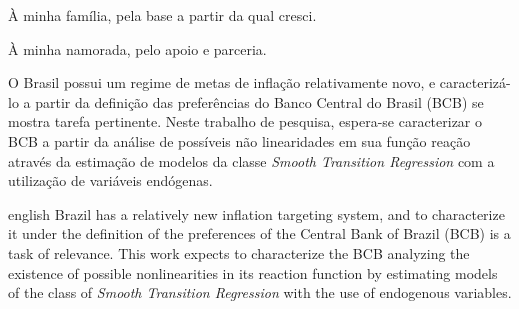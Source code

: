 \documentclass[
	article,			%
	11pt,				%
	oneside,			%
	a4paper,			%
	english,			%
	brazil,				%
	]{abntex2}
\begin{document}
\pagebreak
\begin{agradecimentos}
À minha família, pela base a partir da qual cresci. 

À minha namorada, pelo apoio e parceria.

\end{agradecimentos}


\pagebreak
\setlength{\absparsep}{18pt} %
\begin{resumo}
 O Brasil possui um regime de metas de inflação relativamente novo, e caracterizá-lo a partir da definição das preferências do Banco Central do Brasil (BCB) se mostra tarefa pertinente. Neste trabalho de pesquisa, espera-se caracterizar o BCB a partir da análise de possíveis não linearidades em sua função reação através da estimação de modelos da classe \textit{Smooth Transition Regression} com a utilização de variáveis endógenas.

\end{resumo}

\pagebreak
\begin{resumo}[Abstract]
 \begin{otherlanguage*}{english}
   Brazil has a relatively new inflation targeting system, and to characterize it under the definition of the preferences of the Central Bank of Brazil (BCB) is a task of relevance. This work expects to characterize the BCB analyzing the existence of possible nonlinearities in its reaction function by estimating models of the class of \textit{Smooth Transition Regression} with the use of endogenous variables.

   \vspace{\onelineskip}
 
   \noindent 
 \end{otherlanguage*}
\end{resumo}

\pagebreak
\begin{KeepFromToc}
  \tableofcontents
\end{KeepFromToc}
\pagebreak

\begin{KeepFromToc}
  \def\@tocrmarg{2.55em plus 3em}
	\listoftables
\end{KeepFromToc}
\pagebreak

\begin{KeepFromToc}
  \listoffigures
\end{KeepFromToc}
\pagebreak
\end{document}
